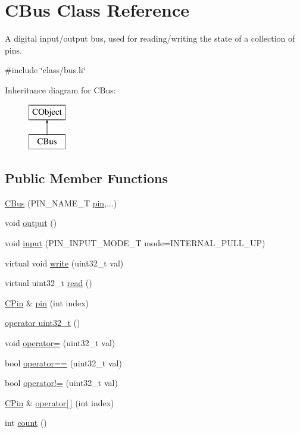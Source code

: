\hypertarget{class_c_bus}{\section{C\-Bus Class Reference}
\label{class_c_bus}
}


A digital input/output bus, used for reading/writing the state of a collection of pins.  




{\ttfamily \#include \char`\"{}class/bus.\-h\char`\"{}}

Inheritance diagram for C\-Bus\-:\begin{figure}[H]
\begin{center}
\leavevmode
\includegraphics[height=2.000000cm]{de/d89/class_c_bus}
\end{center}
\end{figure}
\subsection*{Public Member Functions}
\begin{DoxyCompactItemize}
\item 
\hyperlink{class_c_bus_a5f859ac1582a6cbe9b5b420c6c051e63}{C\-Bus} (P\-I\-N\-\_\-\-N\-A\-M\-E\-\_\-\-T \hyperlink{class_c_bus_a94da38619defc1c41c16c04c4c7991f8}{pin},...)
\item 
void \hyperlink{class_c_bus_a5f797dca77eb5a86048c65e567a2d233}{output} ()
\item 
void \hyperlink{class_c_bus_ad45a06493f12aef3d096ac3ed86a3b8f}{input} (P\-I\-N\-\_\-\-I\-N\-P\-U\-T\-\_\-\-M\-O\-D\-E\-\_\-\-T mode=I\-N\-T\-E\-R\-N\-A\-L\-\_\-\-P\-U\-L\-L\-\_\-\-U\-P)
\item 
virtual void \hyperlink{class_c_bus_a4852669ff7ae53e68cf125aa49a87bd0}{write} (uint32\-\_\-t val)
\item 
virtual uint32\-\_\-t \hyperlink{class_c_bus_ae5c9d649c6f6b22a93fb29e0152a57c1}{read} ()
\item 
\hyperlink{class_c_pin}{C\-Pin} \& \hyperlink{class_c_bus_a94da38619defc1c41c16c04c4c7991f8}{pin} (int index)
\item 
\hyperlink{class_c_bus_add3835bd7327b63bdaa480938d5a8adc}{operator uint32\-\_\-t} ()
\item 
void \hyperlink{class_c_bus_a9f639b395906de4549c51deb0a0ad79c}{operator=} (uint32\-\_\-t val)
\item 
bool \hyperlink{class_c_bus_a55d1c493025b37e0f34801b8ced31068}{operator==} (uint32\-\_\-t val)
\item 
bool \hyperlink{class_c_bus_a3ea59ccbb16b92e2763a00b3baa10fd6}{operator!=} (uint32\-\_\-t val)
\item 
\hyperlink{class_c_pin}{C\-Pin} \& \hyperlink{class_c_bus_a12e4d076164971de589cbc5b2f6537e2}{operator\mbox{[}$\,$\mbox{]}} (int index)
\item 
int \hyperlink{class_c_bus_a4fa0e4c537c237278fe8092f4d8e26fb}{count} ()
\end{DoxyCompactItemize}


